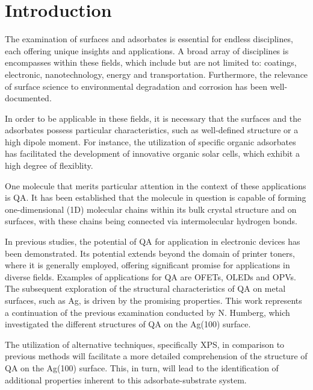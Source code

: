 \chapter{Introduction}

The examination of surfaces and adsorbates is essential for endless disciplines, each offering unique insights and applications. A broad array of disciplines is encompasses within these fields, which include but are not limited to: coatings, electronic, nanotechnology, energy and transportation.\autocite{URI2023} Furthermore, the relevance of surface science to environmental degradation and corrosion has been well-documented.\autocite{IUVS2023}


In order to be applicable in these fields, it is necessary that the surfaces and the adsorbates possess particular characteristics, such as well-defined structure or a high dipole moment. For instance, the utilization of specific organic adsorbates has facilitated the development of innovative organic solar cells, which exhibit a high degree of flexiblity.\autocite{Abdulrazzaq2013,Chamberlain1983,Green2010}


One molecule that merits particular attention in the context of these applications is \ac{QA}. It has been established that the molecule in question is capable of forming one-dimensional (1D) molecular chains within its bulk crystal structure\autocite{Paulus2007} and on surfaces\autocite{Wagner2014, Eberle2019, Trixler2007, Humberg2024}, with these chains being connected via intermolecular hydrogen bonds.


In previous studies, the potential of \ac{QA} for application in electronic devices has been demonstrated.\autocite{Glowacki2013,DanielGlowacki2012, Wang2016} Its potential extends beyond the domain of printer toners, where it is generally employed, offering significant promise for applications in diverse fields. Examples of applications for \ac{QA} are \acp{OFET}\autocite{Jeon2018, Jeong2017, Kanbur2019, Berg2009}, \acp{OLED}\autocite{Wang2016a, Min2021, Cunha2018} and \acp{OPV}\autocite{Dunst2017, Sung2017}.
The subsequent exploration of the structural characteristics of \ac{QA} on metal surfaces, such as \ac{Ag}, is driven by the promising properties. This work represents a continuation of the previous examination conducted by N. Humberg, which investigated the different structures of \ac{QA} on the Ag(100) surface.\autocite{Humberg2024}


The utilization of alternative techniques, specifically \ac{XPS}, in comparison to previous methods will facilitate a more detailed comprehension of the structure of \ac{QA} on the Ag(100) surface. This, in turn, will lead to the identification of additional properties inherent to this adsorbate-substrate system.

\cleardoublepage